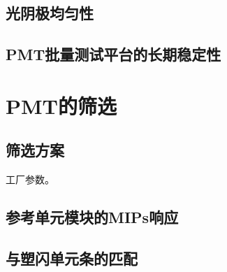 \subsection{光阴极均匀性}
\subsection{PMT批量测试平台的长期稳定性}

\section{PMT的筛选}
\subsection{筛选方案}
工厂参数。
\subsection{参考单元模块的MIPs响应}
\subsection{与塑闪单元条的匹配}